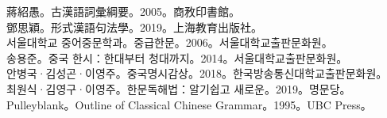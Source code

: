 蔣紹愚。古漢語詞彙綱要。2005。商敄印書館。\\
鄧思穎。形式漢語句法學。2019。上海教育出版社。\\
서울대학교 중어중문학과。중급한문。2006。서울대학교출판문화원。\\
송용준。중국 한시：한대부터 청대까지。2014。서울대학교출판문화원。\\
안병국·김성곤·이영주。중국명시감상。2018。한국방송통신대학교출판문화원。\\
최원식·김영구·이영주。한문독해법：알기쉽고 새로운。2019。명문당。\\
Pulleyblank。Outline of Classical Chinese Grammar。1995。UBC Press。\\
